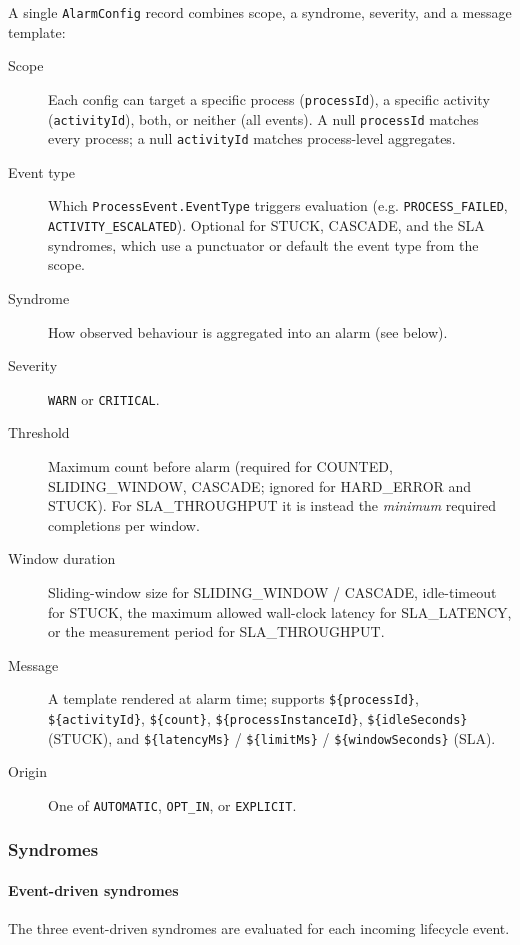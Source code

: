 A single \texttt{AlarmConfig} record combines scope, a syndrome, severity, and a
message template:

\begin{description}
\item[Scope] Each config can target a specific process (\texttt{processId}),
  a specific activity (\texttt{activityId}), both, or neither (all events).
  A null \texttt{processId} matches every process; a null \texttt{activityId}
  matches process-level aggregates.
\item[Event type] Which \texttt{ProcessEvent.EventType} triggers evaluation
  (e.g. \texttt{PROCESS\_FAILED}, \\ \texttt{ACTIVITY\_ESCALATED}). Optional for
  STUCK, CASCADE, and the SLA syndromes, which use a punctuator or default the
  event type from the scope.
\item[Syndrome] How observed behaviour is aggregated into an alarm (see below).
\item[Severity] \texttt{WARN} or \texttt{CRITICAL}.
\item[Threshold] Maximum count before alarm (required for COUNTED, SLIDING\_WINDOW,
  CASCADE; ignored for HARD\_ERROR and STUCK). For SLA\_THROUGHPUT it is instead
  the \emph{minimum} required completions per window.
\item[Window duration] Sliding-window size for SLIDING\_WINDOW / CASCADE,
  idle-timeout for STUCK, the maximum allowed wall-clock latency for SLA\_LATENCY,
  or the measurement period for SLA\_THROUGHPUT.
\item[Message] A template rendered at alarm time; supports
  \texttt{\$\{processId\}}, \texttt{\$\{activityId\}},
  \texttt{\$\{count\}}, \texttt{\$\{processInstanceId\}},
  \texttt{\$\{idleSeconds\}} (STUCK), and
  \texttt{\$\{latencyMs\}} / \texttt{\$\{limitMs\}} / \texttt{\$\{windowSeconds\}} (SLA).
\item[Origin] One of \texttt{AUTOMATIC}, \texttt{OPT\_IN}, or \texttt{EXPLICIT}.
\end{description}

\subsubsection{Syndromes}

\paragraph{Event-driven syndromes}

The three event-driven syndromes are evaluated for each incoming lifecycle
event.

